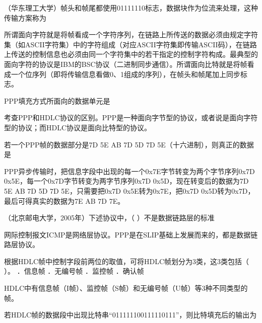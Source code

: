 \question （华东理工大学）帧头和帧尾都使用01111110标志，数据块作为位流来处理，这种传输方案称为
\par{}
\begin{solution}所谓面向字符就是将帧看成一个字符序列，在链路上所传送的数据必须由规定字符集（如ASCII字符集）中的字符组成（对应ASCII字符集即传输ASCII码），在链路上传送的控制信息也必须由同一个字符集中的若干指定的控制字符构成。最典型的面向字符的协议是IBM的BSC协议（二进制同步通信）。所谓面向比特就是将帧看成一个位序列（即将传输信息看做0、1组成的序列），在帧头和帧尾加上同步标志。
\end{solution}
\question PPP填充方式所面向的数据单元是
\par{}
\begin{solution}考查PPP和HDLC协议的区别。PPP是一种面向字节型的协议，或者说是面向字符型的协议；而HDLC协议是面向比特型的协议。
\end{solution}
\question 若一个PPP帧的数据部分是7D 5E AB 7D 5D 7D 5E（十六进制），则真正的数据是
\par{}
\begin{solution}PPP异步传输时，把信息字段中出现的每一个0x7E字节转变为两个字节序列0x7D
0x5E，每一个0x7D字节转变为两字节序列0x7D 0x5D，现在转变后的数据为7D 5E
AB 7D 5D 7D 5E，只需要把0x7D 0x5E转为0x7E，把0x7D
0x5D转为0x7D，最后可得真实的数据为7E AB 7D 7E。
\end{solution}
\question （北京邮电大学，2005年）下述协议中，（ ）不是数据链路层的标准
\par{}
\begin{solution}网际控制报文ICMP是网络层协议。PPP是在SLIP基础上发展而来的，都是数据链路层协议。
\end{solution}
\question 根据HDLC帧中控制字段前两位的取值，可将HDLC帧划分为3类，这3类包括（ ）。
．信息帧 ．无编号帧 ．监控帧 ．确认帧
\par{}
\begin{solution}HDLC中有信息帧（I帧）、监控帧（S帧）和无编号帧（U帧）等3种不同类型的帧。
\end{solution}
\question 若HDLC帧的数据段中出现比特串``011111100111110111''，则比特填充后的输出为
\par{}
